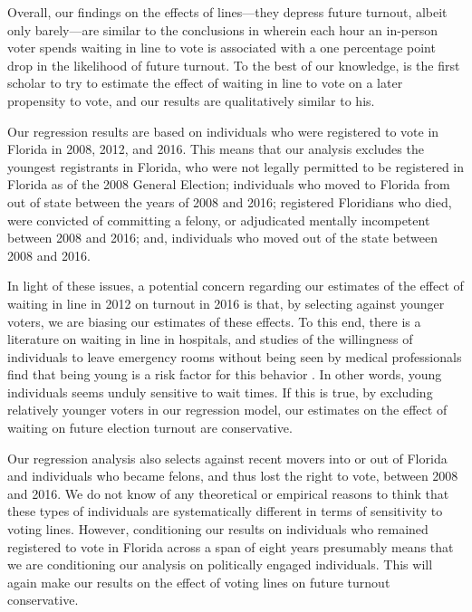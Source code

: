 \documentclass[12pt,titlepage]{article}
\begin{document}
Overall, our findings on the effects of lines---they depress future
turnout, albeit only barely---are similar to the conclusions in
\citet{pettigrew:longlinesminorityprecincts} wherein each hour an
in-person voter spends waiting in line to vote is associated with a
one percentage point drop in the likelihood of future turnout.  To the
best of our knowledge,
\citeauthor{pettigrew:longlinesminorityprecincts} is the first scholar
to try to estimate the effect of waiting in line to vote on a later
propensity to vote, and our results are qualitatively similar to his.

Our regression results are based on individuals who were registered to
vote in Florida in 2008, 2012, and 2016.  This means that our analysis
excludes the youngest registrants in Florida, who were not legally
permitted to be registered in Florida as of the 2008 General Election;
individuals who moved to Florida from out of state between the years
of 2008 and 2016; registered Floridians who died, were convicted of
committing a felony, or adjudicated mentally incompetent between 2008
and 2016; and, individuals who moved out of the state between 2008 and
2016.

In light of these issues, a potential concern regarding our estimates
of the effect of waiting in line in 2012 on turnout in 2016 is that,
by selecting against younger voters, we are biasing our estimates of
these effects. To this end, there is a literature on waiting in line
in hospitals, and studies of the willingness of individuals to leave
emergency rooms without being seen by medical professionals find that
being young is a risk factor for this behavior
\citep{sunetal:lwbs,clareycooke:emergencyroomleave,shaikh:howlongwaiter}.
In other words, young individuals seems unduly sensitive to wait
times.  If this is true, by excluding relatively younger voters
in our regression model, our estimates on the effect of
waiting on future election turnout are conservative.

Our regression analysis also selects against recent movers into or out
of Florida and individuals who became felons, and thus lost the right
to vote, between 2008 and 2016.  We do not know of any theoretical or
empirical reasons to think that these types of individuals are
systematically different in terms of sensitivity to voting lines.
However, conditioning our results on individuals who remained
registered to vote in Florida across a span of eight years presumably
means that we are conditioning our analysis on politically engaged
individuals.  This will again make our results on the effect of voting
lines on future turnout conservative.
\end{document}
